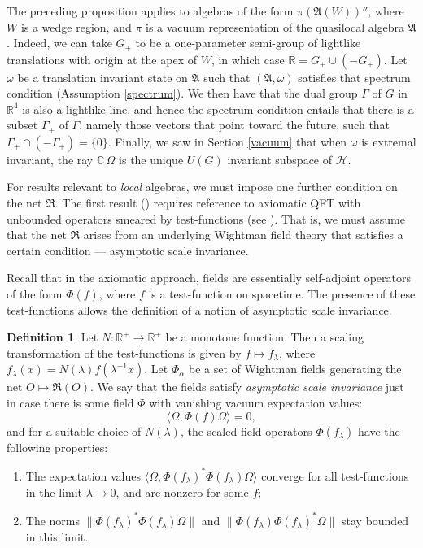\documentclass[12pt]{article}
\newcommand{\alg}[1]{\mathfrak{#1}}
\newcommand{\norm}[1]{\| #1\|}
\theoremstyle{definition}
\theoremstyle{definition}
\newtheorem{defn}[thm]{Definition}
\theoremstyle{remark}
\def\2#1{{\mathcal #1}}
\def\7#1{{\mathbb #1}}
\def\al#1{{\mathfrak #1}}
\def\a{\alpha} \def\b{\beta} \def\g{\gamma} \def\d{\delta}
\def\om{\omega} \def\Om{\Omega} \def\dd{\partial} \def\D{\Delta}
\begin{document}
The preceding proposition applies to algebras of the
form $\pi (\al A(W))''$, where $W$ is a wedge region,
and $\pi$ is a vacuum representation of the quasilocal
algebra $\al A$.  Indeed, we can take $G_+$ to be a
one-parameter semi-group of lightlike translations with
origin at the apex of $W$, in which case $\7R =G_+\cup
(-G_+)$.  Let $\om$ be a translation invariant state on
$\al A$ such that $(\al A,\om )$ satisfies that
spectrum condition (Assumption \ref{spectrum}).  We
then have that the dual group $\Gamma$ of $G$ in $\7R
^4$ is also a lightlike line, and hence the spectrum
condition entails that there is a subset $\Gamma _+$ of
$\Gamma$, namely those vectors that point toward the
future, such that $\Gamma _+\cap (-\Gamma _+)=\{ 0\}$.
Finally, we saw in Section \ref{vacuum} that when $\om$
is extremal invariant, the ray $\7C \,\Om$ is the
unique $U(G)$ invariant subspace of $\2H$.


For results relevant to \emph{local} algebras, we must impose one
further condition on the net $\al R$.  The first result
(\cite{typeIII}) requires reference to axiomatic QFT with unbounded
operators smeared by test-functions (see \cite{SW}).  That is, we must
assume that the net $\al R$ arises from an underlying Wightman field
theory that satisfies a certain condition --- asymptotic scale
invariance.

Recall that in the axiomatic approach, fields are essentially
self-adjoint operators of the form $\Phi (f)$, where $f$ is a
test-function on spacetime.  The presence of these test-functions allows
the definition of a notion of asymptotic scale invariance.

\begin{defn} Let $N:\7R ^+\to \7R^+$ be a monotone function.  Then a
  scaling transformation of the test-functions is given by $f\mapsto
  f_\lambda$, where $f_\lambda (x)=N(\lambda )f(\lambda ^{-1}x)$.  Let
  $\Phi _\a$ be a set of Wightman fields generating the net $O\mapsto
  \alg{R}(O)$.  We say that the fields satisfy \emph{asymptotic scale
    invariance} just in case there is some field $\Phi$ with vanishing
  vacuum expectation values:
$$ \bigl\langle \Om ,\Phi (f)\Om \rangle =0 ,$$
and for a suitable choice of $N(\lambda )$, the scaled field operators $\Phi
(f_\lambda )$ have the following properties:
\begin{enumerate}
\item The expectation values $\langle \Om ,\Phi
  (f_\lambda )^*\Phi (f_\lambda )\Om \rangle$ converge
  for all test-functions in the limit $\lambda \to 0$,
  and are nonzero for some $f$;
\item The norms $\norm{\Phi (f_\lambda )^*\Phi (f_\lambda )\Om }$ and $\norm{\Phi
    (f_\lambda )\Phi (f_\lambda )^*\Om }$ stay bounded in this limit.
\end{enumerate}
\end{defn}
\end{document}
